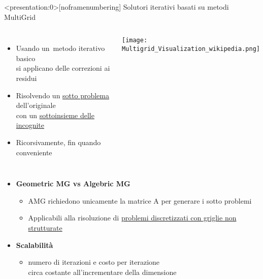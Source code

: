 \begin{frame}<presentation:0>[noframenumbering] {Solutori iterativi basati su metodi MultiGrid}
\begin{columns}
	\begin{itemize}
		\item	Usando un metodo iterativo basico\\
		si applicano delle correzioni ai residui 
		\pause
		\item	Risolvendo un \underline{sotto problema} dell’originale \\
		con un \underline{sottoinsieme delle incognite}
		\item	Ricorsivamente, fin quando conveniente\\
	\end{itemize}
	\pause
	\texttt{[image: Multigrid\_Visualization\_wikipedia.png]}
\end{columns}
\begin{itemize}
	\item	{\bf Geometric MG vs Algebric MG}
	\begin{itemize}
		\item	AMG richiedono unicamente la matrice A per generare i sotto problemi
		\item	Applicabili alla risoluzione di \underline{problemi discretizzati con griglie non strutturate}
	\end{itemize}
	\pause
	\item	{\bf Scalabilità}
	\begin{itemize}
		\item	numero di iterazioni e costo per iterazione\\
		circa costante all’incrementare della dimensione
	\end{itemize}
\end{itemize}
%
%
\end{frame}



